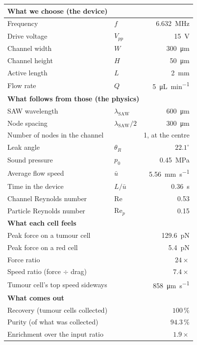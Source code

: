 \documentclass[11pt,a4paper]{article}
\begin{document}
\begin{center}\small
\begin{tabular}{llr}
\toprule
\multicolumn{3}{l}{\textbf{What we choose (the device)}}\\
\midrule
Frequency & $f$ & \SI{6.632}{\mega\hertz} \\
Drive voltage & $V_{pp}$ & \SI{15}{\volt} \\
Channel width & $W$ & \SI{300}{\micro\meter} \\
Channel height & $H$ & \SI{50}{\micro\meter} \\
Active length & $L$ & \SI{2}{\milli\meter} \\
Flow rate & $Q$ & \SI{5}{\micro\liter\per\minute} \\
\midrule
\multicolumn{3}{l}{\textbf{What follows from those (the physics)}}\\
\midrule
SAW wavelength & $\lambda_{\text{SAW}}$ & \SI{600}{\micro\meter} \\
Node spacing & $\lambda_{\text{SAW}}/2$ & \SI{300}{\micro\meter} \\
Number of nodes in the channel & & 1, at the centre \\
Leak angle & $\theta_R$ & $22.1^\circ$ \\
Sound pressure & $p_0$ & \SI{0.45}{\mega\pascal} \\
Average flow speed & $\bar u$ & \SI{5.56}{\milli\meter\per\second} \\
Time in the device & $L/\bar u$ & \SI{0.36}{\second} \\
Channel Reynolds number & $\mathrm{Re}$ & 0.53 \\
Particle Reynolds number & $\mathrm{Re}_p$ & 0.15 \\
\midrule
\multicolumn{3}{l}{\textbf{What each cell feels}}\\
\midrule
Peak force on a tumour cell & & \SI{129.6}{\pico\newton} \\
Peak force on a red cell & & \SI{5.4}{\pico\newton} \\
Force ratio & & $24\times$ \\
Speed ratio (force $\div$ drag) & & $7.4\times$ \\
Tumour cell's top speed sideways & & \SI{858}{\micro\meter\per\second} \\
\midrule
\multicolumn{3}{l}{\textbf{What comes out}}\\
\midrule
Recovery (tumour cells collected) & & $100\,\%$ \\
Purity (of what was collected) & & $94.3\,\%$ \\
Enrichment over the input ratio & & $1.9\times$ \\
\bottomrule
\end{tabular}
\end{center}
\end{document}
